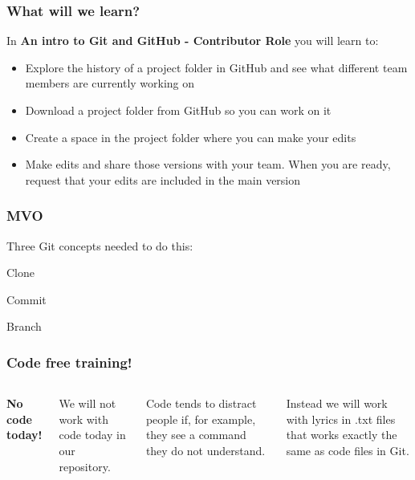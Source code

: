 \documentclass[aspectratio=169]{beamer} %
\begin{document}
\begin{frame}
\begin{columns}[c]
	\end{columns}
\end{frame}




\begin{frame}
\frametitle{What will we learn?}

	In \textbf{An intro to Git and GitHub - Contributor Role} you will learn to:

	\begin{itemize}
		\item Explore the history of a project folder in GitHub and see what different team members are currently working on
		\item Download a project folder from GitHub so you can work on it
		\item Create a space in the project folder where you can make your edits
		\item Make edits and share those versions with your team. When you are ready, request that your edits are included in the main version
	\end{itemize}

\end{frame}


\begin{frame}
\frametitle{MVO}

	\hspace*{2.5cm}\Large{Three Git concepts needed to do this:}

	\begin{itemize}
		\setlength{\itemindent}{3cm}
		\Large{\item Clone}
		\Large{\item Commit}
		\Large{\item Branch}
	\end{itemize}

\end{frame}


\begin{frame}
\frametitle{Code free training!}

	\begin{columns}[c]


		\textbf{No code today!}

		\vspace{.5cm}

		We will not work with code today in our repository.

		\vspace{.25cm}

		Code tends to distract people if, for example, they see a command they do not understand.

		\vspace{.25cm}

		Instead we will work with lyrics in .txt files that works exactly the same as code files in Git.


	\end{columns}
\end{frame}
\end{document}
